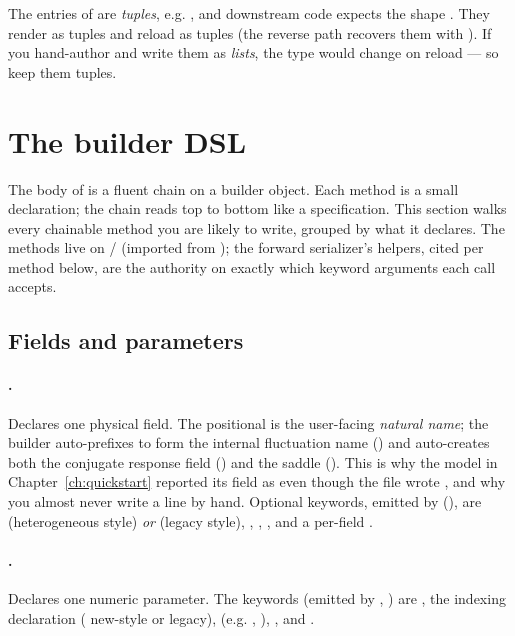 \begin{gotcha}
The entries of  are \emph{tuples}, e.g.
, and downstream code expects the shape
. They render as tuples and reload as
tuples (the reverse path recovers them with ). If you
hand-author  and write them as \emph{lists}, the type would change
on reload --- so keep them tuples.
\end{gotcha}

\section{The builder DSL}

The body of  is a fluent chain on a builder object. Each method is
a small declaration; the chain reads top to bottom like a specification. This
section walks every chainable method you are likely to write, grouped by what it
declares. The methods live on  /
 (imported from ); the forward
serializer's  helpers, cited per method below, are the authority
on exactly which keyword arguments each call accepts.

\subsection{Fields and parameters}

\paragraph{.} Declares one physical field. The
positional  is the user-facing \emph{natural name}; the builder
auto-prefixes  to form the internal fluctuation name () and
auto-creates both the conjugate response field () and the saddle
(). This is why the model in Chapter~\ref{ch:quickstart} reported its
field as  even though the file wrote , and why you almost never
write a  line by hand. Optional keywords, emitted by
 (), are
 (heterogeneous style) \emph{or}  (legacy
style), , , , and a per-field
.

\paragraph{.} Declares one
numeric parameter. The keywords (emitted by ,
) are , the indexing
declaration ( new-style or  legacy),
 (e.g. , ), , and
.

